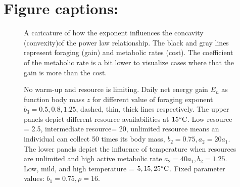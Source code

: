 \section*{Figure captions:}
\begin{figure}[H]
\begin{center}
\caption{
	A caricature of how the exponent influences the concavity (convexity)of the power law relationship.
	The black and gray lines represent foraging (gain) and  metabolic rates (cost).
	The coefficient of the metabolic rate is a bit lower to visualize cases where that the gain is more than the cost.
}
\label{fig1}
\end{center}
\end{figure}
%
\begin{figure}[H]
\begin{center}
\caption{
	No warm-up and resource is limiting.
	Daily net energy gain  $E_n$ as function body mass $z$ for different value of foraging exponent $b_3 = 0.5, 0.8, 1.25$, dashed, thin, thick lines respectively.
	The upper panels depict different resource availabilities at $15 ^{\circ} \rm{C}$. 
	Low resource = 2.5, intermediate resource= 20, unlimited resource means an individual can collect 50 times its body mass, $b_2 = 0.75, a_2 = 20 a_1$. 
	The lower panels depict the influence of temperature when resources are unlimited and high active metabolic rate $a_2 = 40 a_1, b_2  = 1.25$.
	Low, mild, and high temperature = $5, 15, 25^{\circ} \rm{C}$.
	Fixed parameter values: $b_1 = 0.75, \rho = 16$.
}
\label{fig2}
\end{center}
\end{figure}

